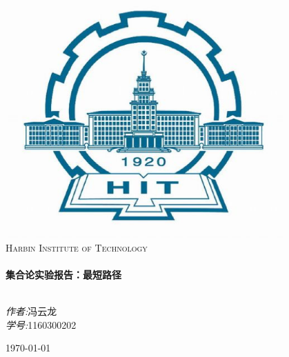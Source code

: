 \documentclass[a4paper,10pt]{ctexart}
\begin{document}
\begin{titlepage}

\begin{center}


\includegraphics[width=0.8\textwidth]{./HIT.eps}\\[1cm]

\textsc{\LARGE Harbin Institute of Technology}\\[1.5cm]

\hrulefill \\[0.4cm]
{ \huge \bfseries 集合论实验报告：最短路径}\\[0.4cm]
\hrulefill \\[1.5cm]

\begin{minipage}{0.4\textwidth}
\begin{flushleft} \large
\end{flushleft}
\end{minipage}
\begin{minipage}{0.4\textwidth}
\begin{flushright} \large
\emph{作者:}冯云龙 \\
\emph{学号:}1160300202
\end{flushright}
\end{minipage}

\vfill

{\large \today}

\end{center}
\end{titlepage}
\end{document}
